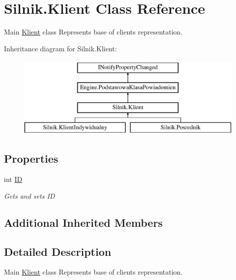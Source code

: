 \hypertarget{class_silnik_1_1_klient}{}\section{Silnik.\+Klient Class Reference}
\label{class_silnik_1_1_klient}


Main \mbox{\hyperlink{class_silnik_1_1_klient}{Klient}} class Represents base of clients representation.  


Inheritance diagram for Silnik.\+Klient\+:\begin{figure}[H]
\begin{center}
\leavevmode
\includegraphics[height=4.000000cm]{class_silnik_1_1_klient}
\end{center}
\end{figure}
\subsection*{Properties}
\begin{DoxyCompactItemize}
\item 
int \mbox{\hyperlink{class_silnik_1_1_klient_ab301349e81e7495a1b07a1105d89e80b}{ID}}
\begin{DoxyCompactList}\small\item\em Gets and sets ID \end{DoxyCompactList}\end{DoxyCompactItemize}
\subsection*{Additional Inherited Members}


\subsection{Detailed Description}
Main \mbox{\hyperlink{class_silnik_1_1_klient}{Klient}} class Represents base of clients representation. 




